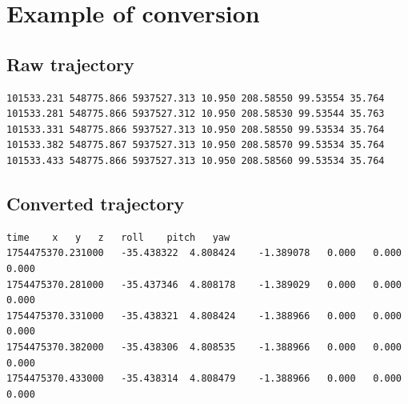 \section{Example of conversion}

\subsection*{Raw trajectory}

\begin{lstlisting}[numbers=none]
101533.231 548775.866 5937527.313 10.950 208.58550 99.53554 35.764
101533.281 548775.866 5937527.312 10.950 208.58530 99.53544 35.763
101533.331 548775.866 5937527.313 10.950 208.58550 99.53534 35.764
101533.382 548775.867 5937527.313 10.950 208.58570 99.53534 35.764
101533.433 548775.866 5937527.313 10.950 208.58560 99.53534 35.764
\end{lstlisting}

\subsection*{Converted trajectory}

\begin{lstlisting}[numbers=none]
time	x	y	z	roll	pitch	yaw
1754475370.231000	-35.438322	4.808424	-1.389078	0.000	0.000	0.000
1754475370.281000	-35.437346	4.808178	-1.389029	0.000	0.000	0.000
1754475370.331000	-35.438321	4.808424	-1.388966	0.000	0.000	0.000
1754475370.382000	-35.438306	4.808535	-1.388966	0.000	0.000	0.000
1754475370.433000	-35.438314	4.808479	-1.388966	0.000	0.000	0.000
\end{lstlisting}